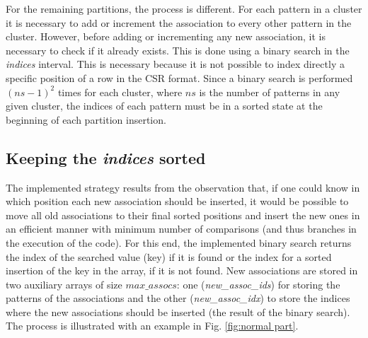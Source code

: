 For the remaining partitions, the process is different.
For each pattern in a cluster it is necessary to add or increment the association to every other pattern in the cluster.
However, before adding or incrementing any new association, it is necessary to check if it already exists.
This is done using a binary search in the \emph{indices} interval.
This is necessary because it is not possible to index directly a specific position of a row in the CSR format.
Since a binary search is performed $(ns - 1)^2$ times for each cluster, where $ns$ is the number of patterns in any given cluster, the indices of each pattern must be in a sorted state at the beginning of each partition insertion.

\subsection{Keeping the \emph{indices} sorted}



The implemented strategy results from the observation that, if one could know in which position each new association should be inserted, it would be possible to move all old associations to their final sorted positions and insert the new ones in an efficient manner with minimum number of comparisons (and thus branches in the execution of the code).
For this end, the implemented binary search returns the index of the searched value (key) if it is found or the index for a sorted insertion of the key in the array, if it is not found.
New associations are stored in two auxiliary arrays of size $max\_assocs$: one (\emph{new\_assoc\_ids}) for storing the patterns of the associations and the other (\emph{new\_assoc\_idx}) to store the indices where the new associations should be inserted (the result of the binary search).
The process is illustrated with an example in Fig. \ref{fig:normal part}. %

